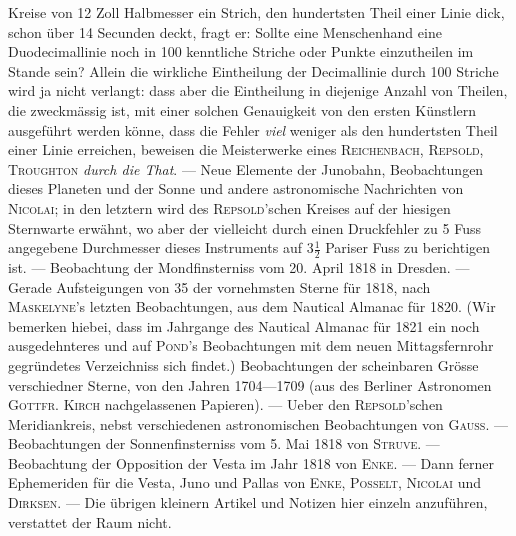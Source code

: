 Kreise von 12 Zoll Halbmesser ein Strich, den hundertsten Theil einer Linie dick, schon über 14 Secunden deckt, fragt er: Sollte eine Menschenhand eine Duodecimallinie noch in 100 kenntliche Striche oder Punkte einzutheilen im Stande sein? Allein die wirkliche Eintheilung der Decimallinie durch 100 Striche wird ja nicht verlangt: dass aber die Eintheilung in diejenige Anzahl von Theilen, die zweckmässig ist, mit einer solchen Genauigkeit von den ersten Künstlern ausgeführt werden könne, dass die Fehler \emph{viel} weniger als den hundertsten Theil einer Linie erreichen, beweisen die Meisterwerke eines \textsc{Reichenbach}, \textsc{Repsold}, \textsc{Troughton} \emph{durch die That}. --- Neue Elemente der Junobahn, Beobachtungen dieses Planeten und der Sonne und andere astronomische Nachrichten von \textsc{Nicolai}; in den letztern wird des \textsc{Repsold}'schen Kreises auf der hiesigen Sternwarte erwähnt, wo aber der vielleicht durch einen Druckfehler zu 5 Fuss angegebene Durchmesser dieses Instruments auf $3\tfrac{1}{2}$ Pariser Fuss zu berichtigen ist. --- Beobachtung der Mondfinsterniss vom 20. April 1818 in Dresden. --- Gerade Aufsteigungen von 35 der vornehmsten Sterne für 1818, nach \textsc{Maskelyne}'s letzten Beobachtungen, aus dem Nautical Almanac für 1820. (Wir bemerken hiebei, dass im Jahrgange des Nautical Almanac für 1821 ein noch ausgedehnteres und auf \textsc{Pond}'s Beobachtungen mit dem neuen Mittagsfernrohr gegründetes Verzeichniss sich findet.) Beobachtungen der scheinbaren Grösse verschiedner Sterne, von den Jahren 1704---1709 (aus des Berliner Astronomen \textsc{Gottfr. Kirch} nachgelassenen Papieren). --- Ueber den \textsc{Repsold}'schen Meridiankreis, nebst verschiedenen astronomischen Beobachtungen von \textsc{Gauss}. --- Beobachtungen der Sonnenfinsterniss vom 5. Mai 1818 von \textsc{Struve}. --- Beobachtung der Opposition der Vesta im Jahr 1818 von \textsc{Enke}. --- Dann ferner Ephemeriden für die Vesta, Juno und Pallas von \textsc{Enke}, \textsc{Posselt}, \textsc{Nicolai} und \textsc{Dirksen}. --- Die übrigen kleinern Artikel und Notizen hier einzeln anzuführen, verstattet der Raum nicht.
